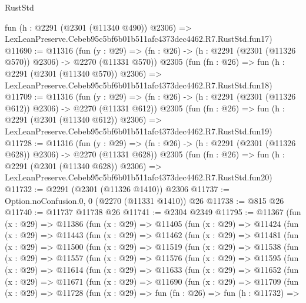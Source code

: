 \begin{lexlean}{RustStd}
\begin{coremodule}
    fun (h : @2291 (@2301 (@11340 @490)) @2306) =>
    LexLeanPreserve.Cebeb95c5bf6b01b511afc4373dec4462.R7.RustStd.fun17)
@11690 := @11316
    (fun (y : @29) => (fn : @26) -> (h : @2291 (@2301 (@11326 @570)) @2306) -> @2270 (@11331 @570))
    @2305
    (fun (fn : @26) =>
    fun (h : @2291 (@2301 (@11340 @570)) @2306) =>
    LexLeanPreserve.Cebeb95c5bf6b01b511afc4373dec4462.R7.RustStd.fun18)
@11709 := @11316
    (fun (y : @29) => (fn : @26) -> (h : @2291 (@2301 (@11326 @612)) @2306) -> @2270 (@11331 @612))
    @2305
    (fun (fn : @26) =>
    fun (h : @2291 (@2301 (@11340 @612)) @2306) =>
    LexLeanPreserve.Cebeb95c5bf6b01b511afc4373dec4462.R7.RustStd.fun19)
@11728 := @11316
    (fun (y : @29) => (fn : @26) -> (h : @2291 (@2301 (@11326 @628)) @2306) -> @2270 (@11331 @628))
    @2305
    (fun (fn : @26) =>
    fun (h : @2291 (@2301 (@11340 @628)) @2306) =>
    LexLeanPreserve.Cebeb95c5bf6b01b511afc4373dec4462.R7.RustStd.fun20)
@11732 := @2291 (@2301 (@11326 @1410)) @2306
@11737 := Option.noConfusion.{0, 0} (@2270 (@11331 @1410)) @26
@11738 := @815 @26
@11740 := @11737 @11738 @26
@11741 := @2304 @2349
@11795 := @11367
    (fun (x : @29) =>
    @11386
      (fun (x : @29) =>
      @11405
        (fun (x : @29) =>
        @11424
          (fun (x : @29) =>
          @11443
            (fun (x : @29) =>
            @11462
              (fun (x : @29) =>
              @11481
                (fun (x : @29) =>
                @11500
                  (fun (x : @29) =>
                  @11519
                    (fun (x : @29) =>
                    @11538
                      (fun (x : @29) =>
                      @11557
                        (fun (x : @29) =>
                        @11576
                          (fun (x : @29) =>
                          @11595
                            (fun (x : @29) =>
                            @11614
                              (fun (x : @29) =>
                              @11633
                                (fun (x : @29) =>
                                @11652
                                  (fun (x : @29) =>
                                  @11671
                                    (fun (x : @29) =>
                                    @11690
                                      (fun (x : @29) =>
                                      @11709
                                        (fun (x : @29) =>
                                        @11728
                                          (fun (x : @29) =>
                                          fun (fn : @26) =>
                                          fun (h : @11732) =>

\end{coremodule}
\end{lexlean}
